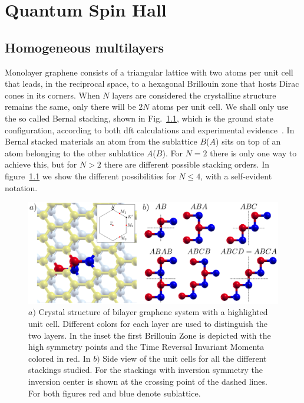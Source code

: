 
\chapter{Quantum Spin Hall}
\label{ch:QSH}
\section{Homogeneous multilayers}\label{Homogeneous}

Monolayer graphene consists of a triangular lattice with two atoms per unit cell that leads, in the reciprocal space, to a hexagonal Brillouin zone that hosts Dirac cones in its corners.
When $N$ layers are considered the crystalline structure remains the same, only there will be $2N$ atoms per unit cell. We shall only use the so called Bernal stacking, shown in  Fig.~\ref{Structure}, which is the ground state configuration, according to both \ac{dft} calculations and experimental evidence~\cite{Norimatsu2010,Charlier1994,Charlier1994a}. In Bernal stacked materials an atom from the sublattice $B$($A$) sits on top of an atom belonging to the other sublattice $A$($B$).
For $N=2$ there is only one way to achieve this, but for $N>2$ there are different possible stacking orders. In figure~\ref{Structure} we show the different possibilities for $N\leq4$, with a self-evident notation.

\begin{figure}[h!]
\centering
\includegraphics{appendix/fig_qsh/structure.png}
\caption{$a)$ Crystal structure of bilayer graphene system with a highlighted unit cell. Different colors for each layer are used to distinguish the two layers. In the inset the first Brillouin Zone is depicted with the high symmetry points and the Time Reversal Invariant Momenta colored in red. In $b)$ Side view of the unit cells for all the different stackings studied. For the stackings with inversion symmetry the inversion center is shown at the crossing point of the dashed lines. For both figures red and blue denote sublattice.}
\label{Structure}
\end{figure}

